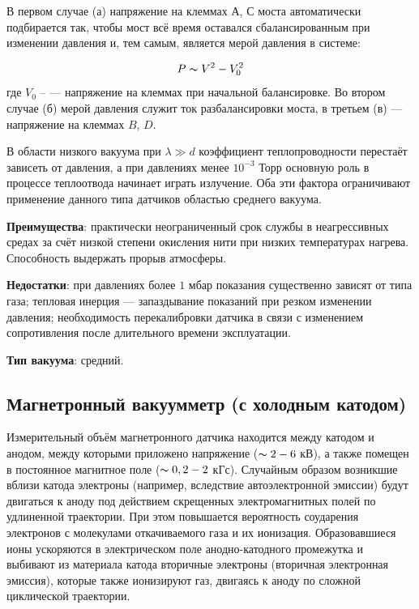 \documentclass[a4paper, 12pt]{article} %
\begin{document}
В первом случае (а) напряжение на клеммах $А$, $С$ моста автоматически подбирается так, чтобы мост всё время оставался сбалансированным при изменении давления и, тем самым, является мерой давления в системе: 

\begin{equation}
	P \thicksim V^2 - V_{0}^2
\end{equation}
где $V_0$ -- — напряжение на клеммах при начальной балансировке.
Во втором случае (б) мерой давления служит ток разбалансировки моста, в третьем (в) — напряжение на клеммах $B$, $D$. 

В области низкого вакуума при $\lambda \gg d$ коэффициент теплопроводности перестаёт зависеть от давления, а при давлениях менее $10^{-3}$ Торр
основную роль в процессе теплоотвода начинает играть излучение. Оба эти фактора ограничивают применение данного типа датчиков областью среднего вакуума.

\textbf{Преимущества}: практически неограниченный срок службы
в неагрессивных средах за счёт низкой степени окисления нити
при низких температурах нагрева. Способность выдержать прорыв атмосферы.

\textbf{Недостатки}: при давлениях более $1$ мбар показания существенно
зависят от типа газа; тепловая инерция — запаздывание показаний при резком изменении давления; необходимость перекалибровки датчика в связи с изменением сопротивления после длительного времени эксплуатации.

\textbf{Тип вакуума}: средний.


\subsection{Магнетронный вакуумметр (с холодным катодом)}

Измерительный объём магнетронного датчика находится
между катодом и анодом, между которыми приложено напряжение
($\thicksim 2-6$ кВ), а также помещен в постоянное магнитное поле ($\thicksim 0,2-2$ кГс).
Случайным образом возникшие вблизи катода электроны (например,
вследствие автоэлектронной эмиссии) будут двигаться к аноду под действием скрещенных электромагнитных полей по удлиненной траектории. При этом повышается вероятность соударения электронов с молекулами откачиваемого газа и их ионизация. Образовавшиеся ионы ускоряются в электрическом поле анодно-катодного промежутка и выбивают из материала катода вторичные электроны (вторичная электронная эмиссия), которые также ионизируют газ, двигаясь к аноду по сложной циклической траектории.
\end{document}
